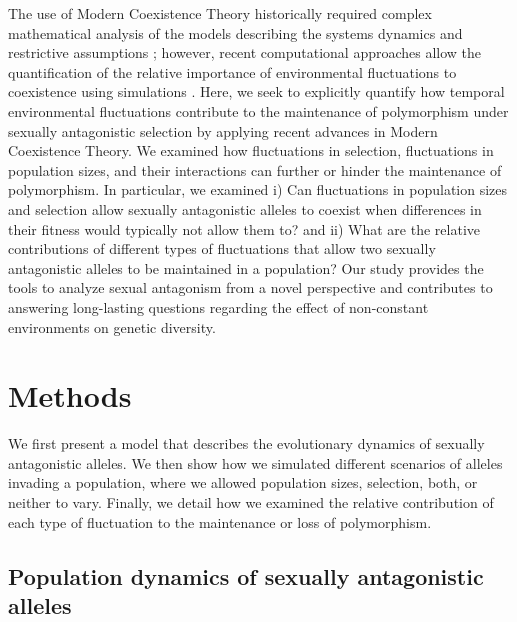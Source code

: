 \documentclass[12pt]{article}
\begin{document}
The use of Modern Coexistence Theory historically required complex mathematical analysis of the models describing the systems dynamics and restrictive assumptions \citep{barabas_chessons_2018}; however, recent computational approaches allow the quantification of the relative importance of environmental fluctuations to coexistence using simulations \citep{ellner2016quantify,ellner_expanded_2019,shoemaker2020}. Here, we seek to explicitly quantify how temporal environmental fluctuations contribute to the maintenance of polymorphism under sexually antagonistic selection by applying recent advances in Modern Coexistence Theory.  We examined how fluctuations in selection, fluctuations in population sizes, and their interactions can further or hinder the maintenance of polymorphism. In particular, we examined i) Can fluctuations in population sizes and selection allow sexually antagonistic alleles to coexist when differences in their fitness would typically not allow them to? and ii) What are the relative contributions of different types of fluctuations that allow two sexually antagonistic alleles to be maintained in a population? Our study provides the tools to analyze sexual antagonism from a novel perspective and contributes to answering long-lasting questions regarding the effect of non-constant environments on genetic diversity.


\section{Methods}

We first present a model that describes the evolutionary dynamics of sexually antagonistic alleles. We then show how we simulated different scenarios of alleles invading a population, where we allowed population sizes, selection, both, or neither to vary. Finally, we detail how we examined the relative contribution of each type of fluctuation to the maintenance or loss of polymorphism.

\subsection*{Population dynamics of sexually antagonistic alleles}
\end{document}
